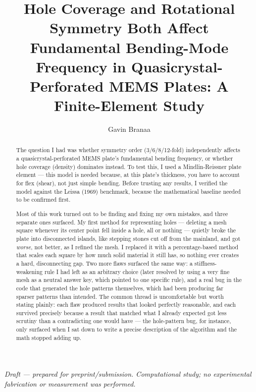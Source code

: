 \documentclass[11pt]{article}
\title{Hole Coverage and Rotational Symmetry Both Affect Fundamental Bending-Mode Frequency in Quasicrystal-Perforated MEMS Plates: A Finite-Element Study}
\author[1]{Gavin Branaa}
\affil[1]{Independent researcher}
\date{}
\begin{document}
\maketitle

\begin{center}
\textit{Draft --- prepared for preprint/submission. Computational study; no experimental fabrication or measurement was performed.}
\end{center}

\begin{abstract}
The question I had was whether symmetry order (3/6/8/12-fold) independently affects a quasicrystal-perforated MEMS plate's fundamental bending frequency, or whether hole coverage (density) dominates instead. To test this, I used a Mindlin-Reissner plate element --- this model is needed because, at this plate's thickness, you have to account for flex (shear), not just simple bending. Before trusting any results, I verified the model against the Leissa (1969) benchmark, because the mathematical baseline needed to be confirmed first.

Most of this work turned out to be finding and fixing my own mistakes, and three separate ones surfaced. My first method for representing holes --- deleting a mesh square whenever its center point fell inside a hole, all or nothing --- quietly broke the plate into disconnected islands, like stepping stones cut off from the mainland, and got \textit{worse}, not better, as I refined the mesh. I replaced it with a percentage-based method that scales each square by how much solid material it still has, so nothing ever creates a hard, disconnecting gap. Two more flaws surfaced the same way: a stiffness-weakening rule I had left as an arbitrary choice (later resolved by using a very fine mesh as a neutral answer key, which pointed to one specific rule), and a real bug in the code that generated the hole patterns themselves, which had been producing far sparser patterns than intended. The common thread is uncomfortable but worth stating plainly: each flaw produced results that looked perfectly reasonable, and each survived precisely because a result that matched what I already expected got less scrutiny than a contradicting one would have --- the hole-pattern bug, for instance, only surfaced when I sat down to write a precise description of the algorithm and the math stopped adding up.


\end{abstract}
\end{document}
